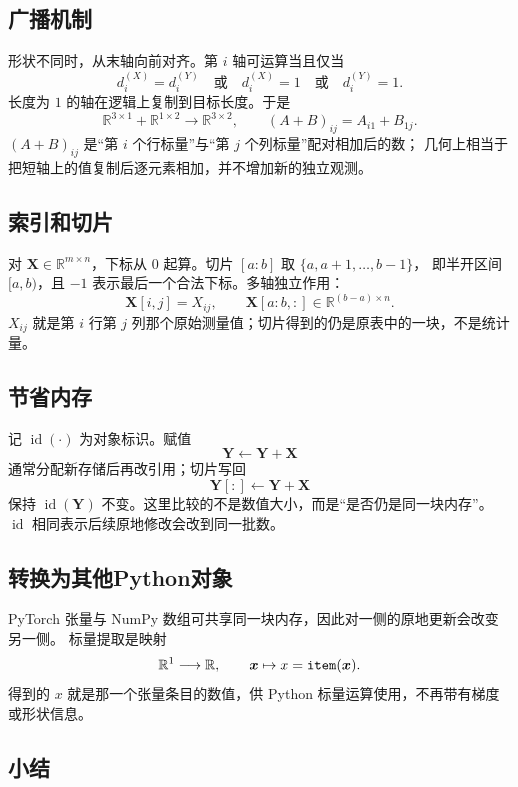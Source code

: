 \subsection{广播机制}

形状不同时，从末轴向前对齐。第 $i$ 轴可运算当且仅当
\[
d_i^{(X)}=d_i^{(Y)}
\quad\text{或}\quad
d_i^{(X)}=1
\quad\text{或}\quad
d_i^{(Y)}=1.
\]
长度为 $1$ 的轴在逻辑上复制到目标长度。于是
\[
\mathbb{R}^{3\times 1}+\mathbb{R}^{1\times 2}
\longrightarrow
\mathbb{R}^{3\times 2},
\qquad
(A+B)_{ij}=A_{i1}+B_{1j}.
\]
$(A+B)_{ij}$ 是“第 $i$ 个行标量”与“第 $j$ 个列标量”配对相加后的数；
几何上相当于把短轴上的值复制后逐元素相加，并不增加新的独立观测。

\subsection{索引和切片}

对 $\bm{X}\in\mathbb{R}^{m\times n}$，下标从 $0$ 起算。切片 $[a:b]$ 取 $\{a,a+1,\ldots,b-1\}$，
即半开区间 $[a,b)$，且 $-1$ 表示最后一个合法下标。多轴独立作用：
\[
\bm{X}[i,j]=X_{ij},\qquad
\bm{X}[a:b,:]\in\mathbb{R}^{(b-a)\times n}.
\]
$X_{ij}$ 就是第 $i$ 行第 $j$ 列那个原始测量值；切片得到的仍是原表中的一块，不是统计量。

\subsection{节省内存}

记 $\operatorname{id}(\cdot)$ 为对象标识。赋值
\[
\bm{Y}\leftarrow \bm{Y}+\bm{X}
\]
通常分配新存储后再改引用；切片写回
\[
\bm{Y}[:]\leftarrow \bm{Y}+\bm{X}
\]
保持 $\operatorname{id}(\bm{Y})$ 不变。这里比较的不是数值大小，而是“是否仍是同一块内存”。
$\operatorname{id}$ 相同表示后续原地修改会改到同一批数。

\subsection{转换为其他Python对象}

PyTorch 张量与 NumPy 数组可共享同一块内存，因此对一侧的原地更新会改变另一侧。
标量提取是映射
\[
\mathbb{R}^{1}\longrightarrow\mathbb{R},\qquad
\bm{x}\mapsto x=\texttt{item}(\bm{x}).
\]
得到的 $x$ 就是那一个张量条目的数值，供 Python 标量运算使用，不再带有梯度或形状信息。

\subsection{小结}


